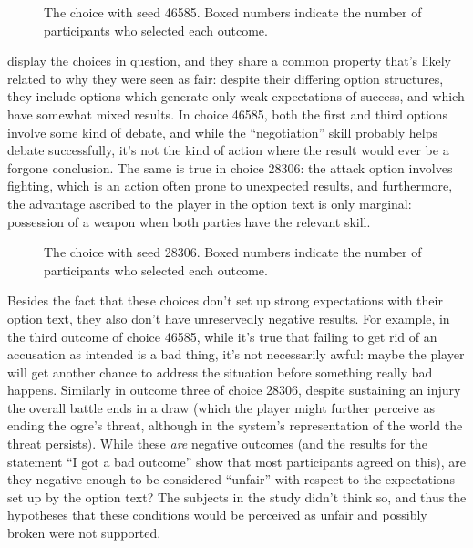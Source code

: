 \begin{figure}[!b]
\caption[``Unexpected failure'' choice 46585]{The \unxf{} choice with seed 46585. Boxed numbers indicate the number of participants who selected each outcome.}
\label{fig:e2-seed-46585}
\end{figure}


 display the choices in question, and they share a common property that's likely related to why they were seen as fair: despite their differing option structures, they include options which generate only weak expectations of success, and which have somewhat mixed results.
%
In choice 46585, both the first and third options involve some kind of debate, and while the ``negotiation'' skill probably helps debate successfully, it's not the kind of action where the result would ever be a forgone conclusion.
%
The same is true in choice 28306: the attack option involves fighting, which is an action often prone to unexpected results, and furthermore, the advantage ascribed to the player in the option text is only marginal: possession of a weapon when both parties have the relevant skill.

\begin{figure}[t]
\caption[``Obvious failure'' choice 28306]{The \obvf{} choice with seed 28306. Boxed numbers indicate the number of participants who selected each outcome.}
\label{fig:e2-seed-28306}
\end{figure}


Besides the fact that these choices don't set up strong expectations with their option text, they also don't have unreservedly negative results.
%
For example, in the third outcome of choice 46585, while it's true that failing to get rid of an accusation as intended is a bad thing, it's not necessarily awful: maybe the player will get another chance to address the situation before something really bad happens.
%
Similarly in outcome three of choice 28306, despite sustaining an injury the overall battle ends in a draw (which the player might further perceive as ending the ogre's threat, although in the system's representation of the world the threat persists).
%
While these \emph{are} negative outcomes (and the results for the statement ``I got a bad outcome'' show that most participants agreed on this), are they negative enough to be considered ``unfair'' with respect to the expectations set up by the option text?
%
The subjects in the study didn't think so, and thus the hypotheses that these conditions would be perceived as unfair and possibly broken were not supported.


